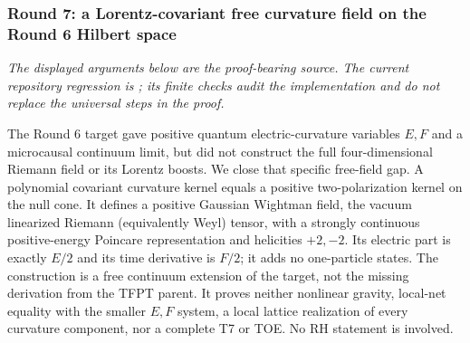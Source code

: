 \subsubsection*{Round 7: a Lorentz-covariant free curvature field on the Round 6 Hilbert space}
\label{sec:toe-r7-covariant}
\noindent\emph{The displayed arguments below are the proof-bearing source.  The current
repository regression is ; its finite checks audit the
implementation and do not replace the universal steps in the proof.}

\begingroup
\def\TT{\mathrm{TT}}
\def\cH{\mathcal H}
\begin{keybox}
The Round 6 target gave positive quantum electric-curvature variables
$E,F$ and a microcausal continuum limit, but did not construct the full
four-dimensional Riemann field or its Lorentz boosts. We close that specific
free-field gap. A polynomial covariant curvature kernel equals a positive
two-polarization kernel on the null cone. It defines a positive Gaussian
Wightman field, the vacuum linearized Riemann (equivalently Weyl) tensor,
with a strongly continuous positive-energy Poincare representation and
helicities $+2,-2$. Its electric part is exactly $E/2$ and its time derivative
is $F/2$; it adds no one-particle states. The construction is a free continuum
extension of the target, not the missing derivation from the TFPT parent.
It proves neither nonlinear gravity, local-net equality with the smaller
$E,F$ system, a local lattice realization of every curvature component,
nor a complete T7 or TOE. No RH statement is involved.
\end{keybox}

